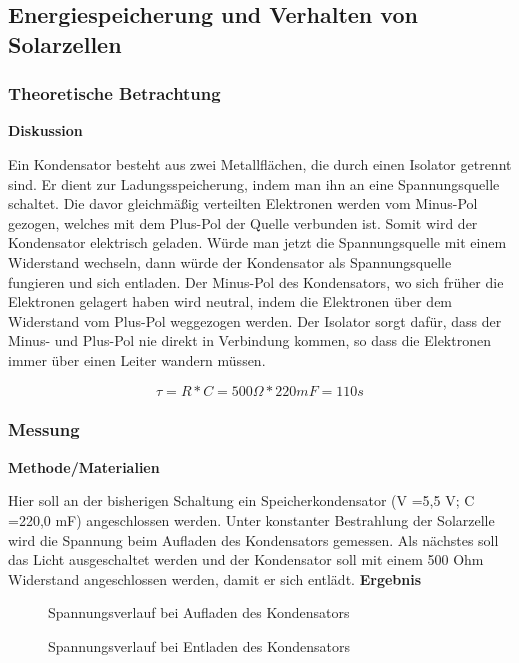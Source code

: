 \subsection {Energiespeicherung und Verhalten von Solarzellen}      %
    \subsubsection{Theoretische Betrachtung}                            %
        \textbf{Diskussion}
        \newline
        \par Ein Kondensator besteht aus zwei Metallflächen, die durch einen Isolator getrennt sind. Er dient zur Ladungsspeicherung, indem man ihn an eine Spannungsquelle schaltet. Die davor gleichmäßig verteilten Elektronen werden vom Minus-Pol gezogen, welches mit dem Plus-Pol der Quelle verbunden ist. Somit wird der Kondensator elektrisch geladen. Würde man jetzt die Spannungsquelle mit einem Widerstand wechseln, dann würde der Kondensator als Spannungsquelle fungieren und sich entladen. Der Minus-Pol des Kondensators, wo sich früher die Elektronen gelagert haben wird neutral, indem die Elektronen über dem Widerstand vom Plus-Pol weggezogen werden. Der Isolator sorgt dafür, dass der Minus- und Plus-Pol nie direkt in Verbindung kommen, so dass die Elektronen immer über einen Leiter wandern müssen.
        
        $$
            \tau = R * C = 500 \Omega * 220mF = 110s
        $$
        
    \subsubsection{Messung}                                             %
        \textbf{Methode/Materialien}
        \newline
        \par Hier soll an der bisherigen Schaltung ein Speicherkondensator (V =5,5 V; C =220,0 mF) angeschlossen
        werden. Unter konstanter Bestrahlung der Solarzelle wird die Spannung beim Aufladen des
        Kondensators gemessen. Als nächstes soll das Licht ausgeschaltet werden und der Kondensator soll mit
        einem 500 Ohm Widerstand angeschlossen werden, damit er sich entlädt.
        \vspace{4mm}
        \newline
        \textbf{Ergebnis}
        \newline
        \par
        \begin{figure}[H]
            \def\svgwidth{\textwidth}
            
            
            \caption{Spannungsverlauf bei Aufladen des Kondensators}
        \end{figure}
        \begin{figure}[H]
            \def\svgwidth{\textwidth}
            
            
            \caption{Spannungsverlauf bei Entladen des Kondensators}
        \end{figure}
